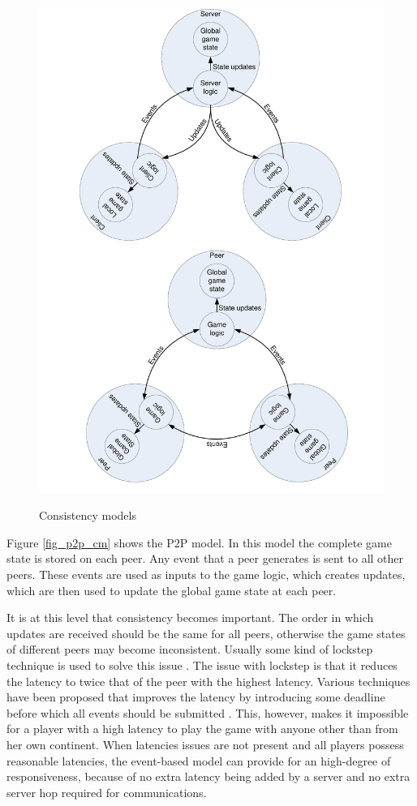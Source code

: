 \documentclass[10pt,a4paper,journal,cspaper,compsoc]{IEEEtran}
\begin{document}
\begin{figure}[htbp]
{\includegraphics[clip=true, viewport= 2.5cm 15cm 19cm 30cm, width=\columnwidth]{CS_P2P_CMs}}
\caption{Consistency models}
\end{figure}
%
Figure \ref{fig_p2p_cm} shows the P2P model. In this model the complete game state is stored on each peer. Any event that a peer generates is sent to
all other peers. These events are used as inputs to the game logic, which creates updates, which are then used to update the global game state at
each peer.

It is at this level that consistency becomes important. The order in which updates are received should be the same for all peers, otherwise the game
states of different peers may become inconsistent. Usually some kind of lockstep technique is used to solve this issue \cite{pessimistic_lock_step}.
The issue with lockstep is that it reduces the latency to twice that of the peer with the highest latency. Various techniques have been proposed that
improves the latency by introducing some deadline before which all events should be submitted \cite{cheat_proof_event_ordering}. This, however, makes
it impossible for a player with a high latency to play the game with anyone other than from her own continent. When latencies issues are not present
and all players possess reasonable latencies, the event-based model can provide for an high-degree of responsiveness, because of no extra latency
being added by a server and no extra server hop required for communications.
\end{document}
